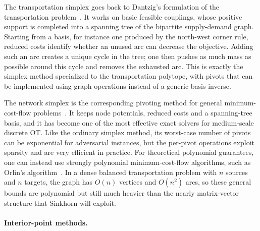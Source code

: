 The transportation simplex goes back to Dantzig's formulation of the transportation problem~\cite{Dantzig51}. It works on basic feasible couplings, whose positive support is completed into a spanning tree of the bipartite supply-demand graph. Starting from a basis, for instance one produced by the north-west corner rule, reduced costs identify whether an unused arc can decrease the objective. Adding such an arc creates a unique cycle in the tree; one then pushes as much mass as possible around this cycle and removes the exhausted arc. This is exactly the simplex method specialized to the transportation polytope, with pivots that can be implemented using graph operations instead of a generic basis inverse.

The network simplex is the corresponding pivoting method for general minimum-cost-flow problems~\cite{bertsekas1988dual}. It keeps node potentials, reduced costs and a spanning-tree basis, and it has become one of the most effective exact solvers for medium-scale discrete OT. Like the ordinary simplex method, its worst-case number of pivots can be exponential for adversarial instances, but the per-pivot operations exploit sparsity and are very efficient in practice. For theoretical polynomial guarantees, one can instead use strongly polynomial minimum-cost-flow algorithms, such as Orlin's algorithm~\cite{Orlin1997}. In a dense balanced transportation problem with $n$ sources and $n$ targets, the graph has $O(n)$ vertices and $O(n^2)$ arcs, so these general bounds are polynomial but still much heavier than the nearly matrix-vector structure that Sinkhorn will exploit.

\paragraph{Interior-point methods.}

